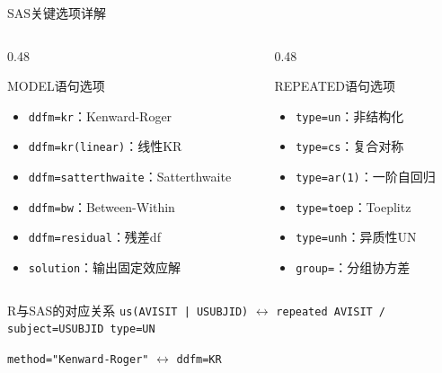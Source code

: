 \documentclass[aspectratio=169,11pt]{beamer}
\begin{document}
\begin{frame}{SAS关键选项详解}
\begin{columns}[T,totalwidth=\textwidth]
\begin{column}{0.48\textwidth}
\begin{block}{MODEL语句选项}
\begin{itemize}
    \item \texttt{ddfm=kr}：Kenward-Roger
    \item \texttt{ddfm=kr(linear)}：线性KR
    \item \texttt{ddfm=satterthwaite}：Satterthwaite
    \item \texttt{ddfm=bw}：Between-Within
    \item \texttt{ddfm=residual}：残差df
    \item \texttt{solution}：输出固定效应解
\end{itemize}
\end{block}
\end{column}
\begin{column}{0.48\textwidth}
\begin{block}{REPEATED语句选项}
\begin{itemize}
    \item \texttt{type=un}：非结构化
    \item \texttt{type=cs}：复合对称
    \item \texttt{type=ar(1)}：一阶自回归
    \item \texttt{type=toep}：Toeplitz
    \item \texttt{type=unh}：异质性UN
    \item \texttt{group=}：分组协方差
\end{itemize}
\end{block}
\end{column}
\end{columns}

\vspace{0.2cm}
\begin{exampleblock}{R与SAS的对应关系}
\centering
\texttt{us(AVISIT | USUBJID)} $\leftrightarrow$ \texttt{repeated AVISIT / subject=USUBJID type=UN}

\texttt{method="Kenward-Roger"} $\leftrightarrow$ \texttt{ddfm=KR}
\end{exampleblock}
\end{frame}
\end{document}
